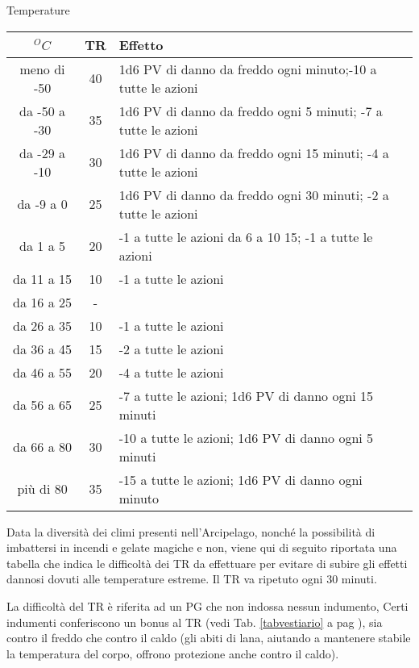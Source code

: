 \begin{table*}[t]
  \begin{center}
    {\Large\sc Temperature}\medskip
    
    \small
    \begin{tabular}{|c|c|l|} \hline 
      $^OC$&TR& Effetto\\ \hline
        \hline 
        meno di -50& 40& 1d6 PV di danno da freddo ogni minuto;-10 a tutte le azioni \\ \hline 
        da -50 a -30& 35& 1d6 PV di danno da freddo ogni 5 minuti; -7 a tutte le azioni \\ \hline 
        da -29 a -10& 30& 1d6 PV di danno da freddo ogni 15
        minuti; -4 a tutte le azioni \\ \hline 
        da -9 a 0& 25& 1d6 PV
        di danno da freddo ogni 30 minuti; -2 a tutte le azioni \\ 
        \hline
        da 1 a 5& 20& -1 a tutte le azioni da 6 a 10 15; -1 a
        tutte le azioni \\ \hline 
        da 11 a 15& 10& -1 a tutte le azioni
        \\ \hline 
        da 16 a 25& - &  \\ \hline 
        da 26 a 35& 10& -1 a
        tutte le azioni \\ \hline da 36 a 45& 15& -2 a tutte le azioni
        \\ \hline 
        da 46 a 55& 20& -4 a tutte le azioni \\ \hline
        da 56 a
        65& 25& -7 a tutte le azioni; 1d6 PV di danno ogni 15 minuti
        \\ \hline
        da 66 a 80& 30& -10 a tutte le azioni; 1d6 PV di
        danno ogni 5 minuti 
        \\ \hline pi\`u di 80&35& -15 a tutte le
        azioni; 1d6 PV di danno ogni minuto\\ \hline
      \end{tabular}
  \caption{Effetti delle Temperature}
  \end{center}
\end{table*}

Data la diversit\`a dei climi presenti nell'Arcipelago,
nonch\'e la possibilit\`a di imbattersi in incendi e gelate magiche e non,
viene qui di seguito riportata una tabella che indica le difficolt\`a dei
TR da effettuare per evitare di subire gli effetti dannosi dovuti alle temperature
estreme. Il TR va ripetuto ogni 30 minuti.

La difficolt\`a del TR \`e riferita ad un PG che non indossa nessun
indumento, Certi indumenti conferiscono un bonus al TR (vedi
Tab. \ref{tabvestiario} a pag \pageref{tabvestiario}), sia contro il
freddo che contro il caldo (gli abiti di lana, aiutando a mantenere
stabile la temperatura del corpo, offrono protezione anche contro il
caldo).

